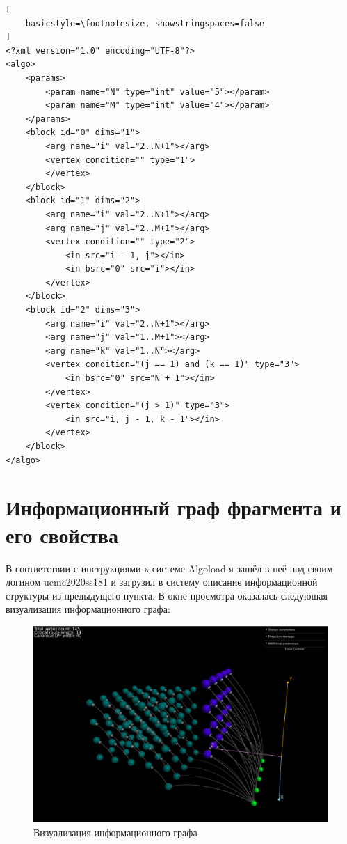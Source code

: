 \documentclass[oneside, final, 14pt]{extarticle}
\begin{document}
\lstset{language=XML}
\begin{minipage}{0.9\linewidth}
\begin{lstlisting}[
    basicstyle=\footnotesize, showstringspaces=false
]
<?xml version="1.0" encoding="UTF-8"?>
<algo>
    <params>
        <param name="N" type="int" value="5"></param>
        <param name="M" type="int" value="4"></param>
    </params>
    <block id="0" dims="1">
        <arg name="i" val="2..N+1"></arg>
        <vertex condition="" type="1">
        </vertex>
    </block>
    <block id="1" dims="2">
        <arg name="i" val="2..N+1"></arg>
        <arg name="j" val="2..M+1"></arg>
        <vertex condition="" type="2">
            <in src="i - 1, j"></in>
            <in bsrc="0" src="i"></in>
        </vertex>
    </block>
    <block id="2" dims="3">
        <arg name="i" val="2..N+1"></arg>
        <arg name="j" val="1..M+1"></arg>
        <arg name="k" val="1..N"></arg>
        <vertex condition="(j == 1) and (k == 1)" type="3">
            <in bsrc="0" src="N + 1"></in>
        </vertex>
        <vertex condition="(j > 1)" type="3">
            <in src="i, j - 1, k - 1"></in>
        </vertex>
    </block>
</algo>
\end{lstlisting}
\end{minipage}

\section*{Информационный граф фрагмента и его свойства}

В соответствии с инструкциями к системе Algoload я зашёл в неё под своим логином
ucmc2020ss181 и загрузил в систему описание информационной структуры из предыдущего
пункта. В окне просмотра оказалась следующая визуализация информационного графа:

\newlength{\mygraphwidth}\setlength{\mygraphwidth}{0.9\textwidth}

\begin{figure}[H]
    \centering
    \includegraphics[width=\mygraphwidth]{1.png}
    \caption{Визуализация информационного графа}
\end{figure}
\end{document}
